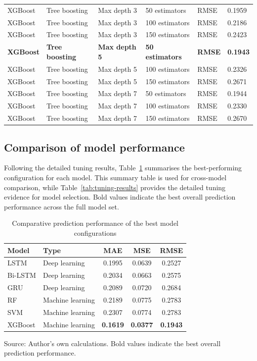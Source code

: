 \begin{landscape}
\begin{longtable}{p{2.2cm}p{3cm}p{3.5cm}p{3.2cm}p{1.6cm}p{1.8cm}}
XGBoost & Tree boosting & Max depth 3 & 50 estimators  & RMSE & 0.1959 \\
XGBoost & Tree boosting & Max depth 3 & 100 estimators & RMSE & 0.2186 \\
XGBoost & Tree boosting & Max depth 3 & 150 estimators & RMSE & 0.2423 \\
\textbf{XGBoost} & \textbf{Tree boosting} & \textbf{Max depth 5} & \textbf{50 estimators} & \textbf{RMSE} & \textbf{0.1943} \\
XGBoost & Tree boosting & Max depth 5 & 100 estimators & RMSE & 0.2326 \\
XGBoost & Tree boosting & Max depth 5 & 150 estimators & RMSE & 0.2671 \\
XGBoost & Tree boosting & Max depth 7 & 50 estimators  & RMSE & 0.1944 \\
XGBoost & Tree boosting & Max depth 7 & 100 estimators & RMSE & 0.2330 \\
XGBoost & Tree boosting & Max depth 7 & 150 estimators & RMSE & 0.2670 \\

\end{longtable}
\end{landscape}

\subsection{Comparison of model performance}

Following the detailed tuning results, Table~\ref{tab:model-comparison} summarises the best-performing configuration for each model. This summary table is used for cross-model comparison, while Table~\ref{tab:tuning-results} provides the detailed tuning evidence for model selection. Bold values indicate the best overall prediction performance across the full model set.

\begin{table}[htbp]
\centering
\caption{Comparative prediction performance of the best model configurations}
\label{tab:model-comparison}
\begin{tabular}{llccc}
\toprule
\textbf{Model} & \textbf{Type} & \textbf{MAE} & \textbf{MSE} & \textbf{RMSE} \\
\midrule
LSTM    & Deep learning    & 0.1995 & 0.0639 & 0.2527 \\
Bi-LSTM & Deep learning    & 0.2034 & 0.0663 & 0.2575 \\
GRU     & Deep learning    & 0.2089 & 0.0720 & 0.2684 \\
RF      & Machine learning & 0.2189 & 0.0775 & 0.2783 \\
SVM     & Machine learning & 0.2307 & 0.0774 & 0.2783 \\
XGBoost & Machine learning & \textbf{0.1619} & \textbf{0.0377} & \textbf{0.1943} \\
\bottomrule
\end{tabular}

\vspace{0.2cm}
\footnotesize Source: Author's own calculations. Bold values indicate the best overall prediction performance.
\end{table}


